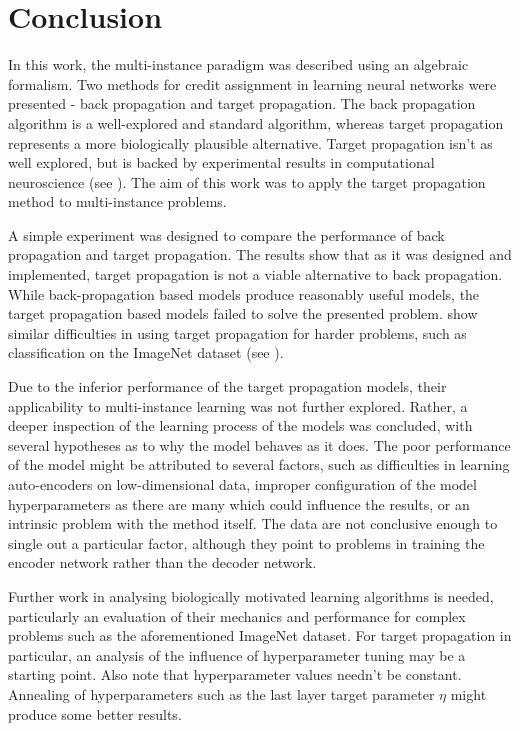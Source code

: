 \chapter*{Conclusion}

In this work, the multi-instance paradigm was described using an algebraic formalism. Two methods for credit assignment in learning neural networks were presented - back propagation and target propagation. The back propagation algorithm is a well-explored and standard algorithm, whereas target propagation represents a more biologically plausible alternative. Target propagation isn't as well explored, but is backed by experimental results in computational neuroscience (see \cite{guerguiev_towards_2017}). The aim of this work was to apply the target propagation method to multi-instance problems.

A simple experiment was designed to compare the performance of back propagation and target propagation. The results show that as it was designed and implemented, target propagation is not a viable alternative to back propagation. While back-propagation based models produce reasonably useful models, the target propagation based models failed to solve the presented problem. \cite{bartunov_assessing_2018} show similar difficulties in using target propagation for harder problems, such as classification on the ImageNet dataset (see \cite{russakovsky_imagenet_2015}).

Due to the inferior performance of the target propagation models, their applicability to multi-instance learning was not further explored. Rather, a deeper inspection of the learning process of the models was concluded, with several hypotheses as to why the model behaves as it does. The poor performance of the model might be attributed to several factors, such as difficulties in learning auto-encoders on low-dimensional data, improper configuration of the model hyperparameters as there are many which could influence the results, or an intrinsic problem with the method itself. The data are not conclusive enough to single out a particular factor, although they point to problems in training the encoder network rather than the decoder network.

Further work in analysing biologically motivated learning algorithms is needed, particularly an evaluation of their mechanics and performance for complex problems such as the aforementioned ImageNet dataset. For target propagation in particular, an analysis of the influence of hyperparameter tuning may be a starting point. Also note that hyperparameter values needn't be constant. Annealing of hyperparameters such as the last layer target parameter \( \eta \) might produce some better results.

